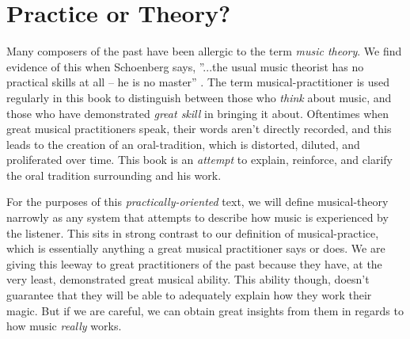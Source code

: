 \section{Practice or Theory?}

Many composers of the past have been allergic to the term \emph{music theory}. We find evidence of this when Schoenberg says, ''...the usual music theorist has no practical skills at all -- he is no master'' \parencite[p. 7]{schoenberg2010theory}. The term \gls{musical-practitioner} is used regularly in this book to distinguish between those who \emph{think} about music, and those who have demonstrated \emph{great skill} in bringing it about. Oftentimes when great musical practitioners speak, their words aren't directly recorded, and this leads to the creation of an \gls{oral-tradition}, which is distorted, diluted, and proliferated over time. This book is an \emph{attempt} to explain, reinforce, and clarify the oral tradition surrounding \BarryFull and his work.

For the purposes of this \emph{practically-oriented} text, we will define \gls{musical-theory} narrowly as any system that attempts to describe how music is experienced by the listener. This sits in strong contrast to our definition of \gls{musical-practice}, which is essentially anything a great musical practitioner says or does. We are giving this leeway to great practitioners of the past because they have, at the very least, demonstrated great musical ability. This ability though, doesn't guarantee that they will be able to adequately explain how they work their magic. But if we are careful, we can obtain great insights from them in regards to how music \emph{really} works.
